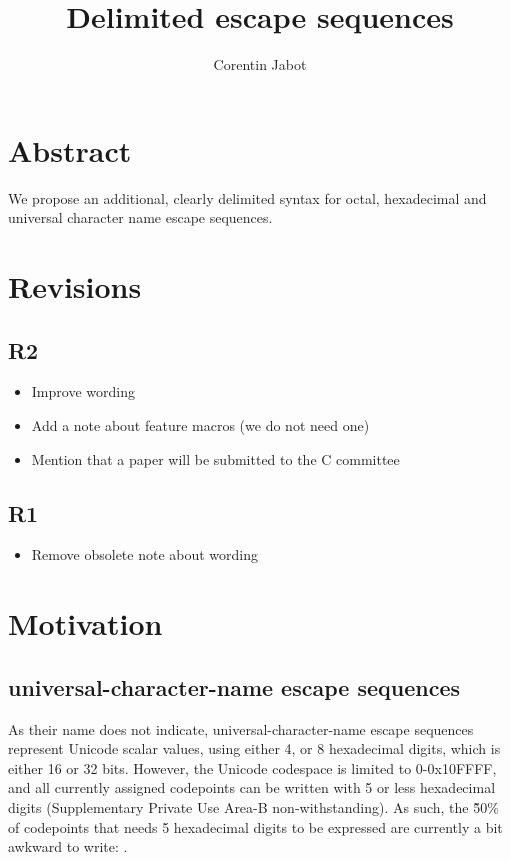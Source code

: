 \documentclass{wg21}
\title{Delimited escape sequences}
\author{Corentin Jabot}{corentin.jabot@gmail.com}
\begin{document}
\maketitle

\paperquote{}

\section{Abstract}

We propose an additional, clearly delimited syntax for octal, hexadecimal and universal character name escape sequences.

\section{Revisions}

\subsection{R2}
\begin{itemize}
    \item Improve wording
    \item Add a note about feature macros (we do not need one)
    \item Mention that a paper will be submitted to the C committee
\end{itemize}

\subsection{R1}
\begin{itemize}
\item Remove obsolete note about wording
\end{itemize}

\section{Motivation}

\subsection{universal-character-name escape sequences}

As their name does not indicate, universal-character-name escape sequences represent Unicode scalar values,
using either 4, or 8 hexadecimal digits, which is either 16 or 32 bits.
However, the Unicode codespace is limited to 0-0x10FFFF, and all currently assigned codepoints can be written with 5 or less
hexadecimal digits (Supplementary Private Use Area-B non-withstanding).
As such, the \~50\% of codepoints that needs 5 hexadecimal digits to be expressed are currently a bit awkward to write: .
\end{document}
